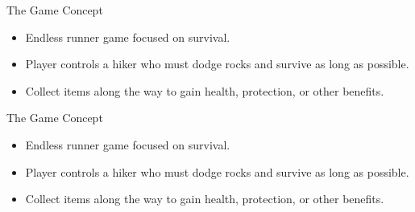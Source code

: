 \begin{frame}{The Game Concept}
    \begin{itemize}
        \item Endless runner game focused on survival.
        \item Player controls a hiker who must dodge rocks and survive as long as possible.
        \item Collect items along the way to gain health, protection, or other benefits.
    \end{itemize}
\end{frame}

\begin{frame}{The Game Concept}
    \begin{itemize}
        \item Endless runner game focused on survival.
        \item Player controls a hiker who must dodge rocks and survive as long as possible.
        \item Collect items along the way to gain health, protection, or other benefits.
    \end{itemize}
\end{frame}